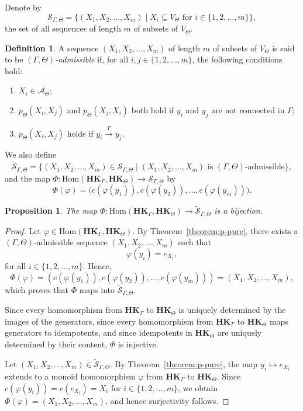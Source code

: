\documentclass[pdflatex,sn-mathphys-num]{sn-jnl}
\newcommand{\hk}{\mathbf{HK}_{\Theta}}
\newcommand{\hkg}{\mathbf{HK}_{\Gamma}}
\newcommand{\vp}{\varphi}
\newcommand{\tog}{\overset{\Gamma}{\to}}
\newcommand{\sgt}{\widetilde{\mathcal{S}}_{\Gamma,\Theta}}
\newtheorem{proposition}[theorem]{Proposition}
\theoremstyle{definition}
\newtheorem{definition}[theorem]{Definition}
\theoremstyle{remark}
\begin{document}
Denote by
\[
\mathcal{S}_{\Gamma, \Theta} = \{(X_1, X_2, \dots, X_m) \mid X_i \subseteq V_{\Theta} \text{ for } i \in \{1, 2, \dots, m\} \},
\]
the set of all sequences of length $m$ of subsets of $V_{\Theta}$.
\begin{definition}\label{definition:p-pure}
   A sequence $(X_1, X_2, \dots, X_m)$ of length $m$ of subsets of $V_{\Theta}$ is said to be $(\Gamma, \Theta)$\emph{-admissible} if, for all $i, j \in \{1, 2, \dots, m\}$, the following conditions hold: 
   \begin{enumerate}[label=(\roman*), ref=\roman*]
        \item $X_i \in \mathcal{A}_{\Theta}$;
        \item $p_{\Theta}(X_i, X_j)$ and $p_{\Theta}(X_j, X_i)$ both hold if $y_i$ and $y_j$ are not connected in $\Gamma$;
        \item $p_{\Theta}(X_i, X_j)$ holds if $y_i \tog y_j$.
    \end{enumerate}
\end{definition}

We also define
\[
\sgt = \{(X_1, X_2, \dots, X_m) \in \mathcal{S}_{\Gamma, \Theta} \mid (X_1, X_2, \dots, X_m) \text{ is $(\Gamma, \Theta)$-admissible} \},
\]
and the map $\Phi : \mathrm{Hom}(\hkg, \hk) \to \mathcal{S}_{\Gamma, \Theta}$ by 
\[
\Phi(\vp) = \big(c(\vp(y_1)), c(\vp(y_2)), \dots, c(\vp(y_m))\big).
\]

\begin{proposition}\label{phi:bijective}
   The map $\Phi : \mathrm{Hom}(\hkg, \hk) \to \sgt$ is a bijection.
\end{proposition}

\begin{proof}
   Let $\vp \in \mathrm{Hom}(\hkg, \hk)$.
   By Theorem~\ref{theorem:p-pure}, there exists a $(\Gamma, \Theta)$-admissible sequence $(X_1, X_2, \dots, X_m)$ such that
   \[
   \vp(y_i) = e_{X_i},
   \]
   for all $i \in \{1, 2, \dots, m\}$.
   Hence, 
   \[
   \Phi(\vp) = (c(\vp(y_1)), c(\vp(y_2)), \dots, c(\vp(y_m))) = (X_1, X_2, \dots, X_m),
   \]
   which proves that $\Phi$ maps into $\sgt$.

   Since every homomorphism from $\hkg$ to $\hk$ is uniquely determined by the images of the generators,
   since every homomorphism from $\hkg$ to $\hk$ maps generators to idempotents, and
   since idempotents in $\hk$ are uniquely determined by their content, $\Phi$ is injective.
   
   Let $(X_1, X_2, \dots, X_m) \in \sgt$.
   By Theorem~\ref{theorem:p-pure}, the map $y_i \mapsto e_{X_i}$ extends to a monoid homomorphism $\vp$ from $\hkg$ to $\hk$.
   Since $c(\vp(y_i)) = c(e_{X_i}) = X_i$ for $i \in \{1, 2, \dots, m\}$, we obtain $\Phi(\vp) = (X_1, X_2, \dots, X_m)$, and hence surjectivity follows.
\end{proof}
\end{document}
